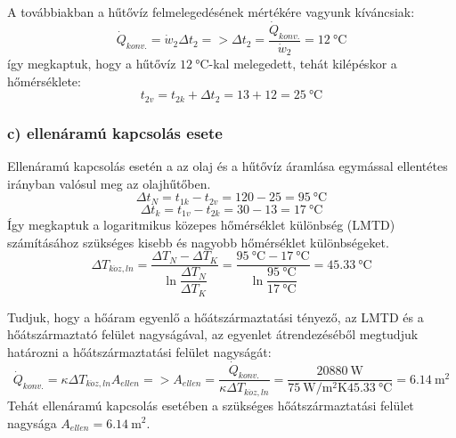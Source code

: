 A továbbiakban a hűtővíz felmelegedésének mértékére vagyunk kíváncsiak: 
\begin{equation}
\dot{Q}_{konv.} = \dot{w}_2 \Delta t_2 => \Delta t_2 = \dfrac {\dot{Q}_{konv.}}{\dot{w}_2} =\SI{12}{\celsius}
\end{equation}
így megkaptuk, hogy a hűtővíz $\SI{12}{\celsius}$-kal melegedett, tehát kilépéskor a hőmérséklete:
\begin{equation}
t_{2v} = t_{2k} + \Delta t_2 = 13 + 12 =\SI{25}{\celsius}
\end{equation}

\subsubsection*{c) ellenáramú kapcsolás esete }
Ellenáramú kapcsolás esetén a az olaj és a hűtővíz áramlása egymással ellentétes irányban valósul meg az olajhűtőben. 
\begin{equation}
\Delta t_N =  t_{1k} - t_{2v} = 120 - 25 =\SI{95}{\celsius}
\end{equation}
\begin{equation}
\Delta t_k =  t_{1v} - t_{2k} = 30 - 13 =\SI{17}{\celsius}
\end{equation}
Így megkaptuk a logaritmikus közepes hőmérséklet különbség (LMTD) számításához szükséges  kisebb és nagyobb hőmérséklet különbségeket.
\begin{equation}
\Delta T_{k\ddot{o}z,ln} 
= 
\dfrac{\Delta T_N - \Delta T_K}{\ln\dfrac{\Delta T_N}{\Delta T_K}} 
= 
\dfrac{\SI{95}{\celsius} - \SI{17}{\celsius}}{\ln\dfrac{\SI{95}{\celsius}}{\SI{17}{\celsius}}} 
= 
\SI{45,33}{\celsius}
\end{equation}

Tudjuk, hogy a hőáram egyenlő a hőátszármaztatási tényező, az LMTD és a hőátszármaztató felület nagyságával, az egyenlet átrendezéséből megtudjuk határozni a hőátszármaztatási felület nagyságát:
\begin{equation}
\dot{Q}_{konv.} = \kappa \Delta T_{k\ddot{o}z,ln} A_{ellen} => A_{ellen} = \dfrac{\dot{Q}_{konv.}}{\kappa \Delta T_{k\ddot{o}z,ln}} = \dfrac{\SI{20880}{\watt}}{\SI{75}{\watt\per\meter\squared\kelvin} \SI{45,33}{\celsius}} = \SI{6,14}{\meter\squared}
\end{equation}
Tehát ellenáramú kapcsolás esetében a szükséges hőátszármaztatási felület nagysága $A_{ellen} = \SI{6,14}{\meter\squared}$.

